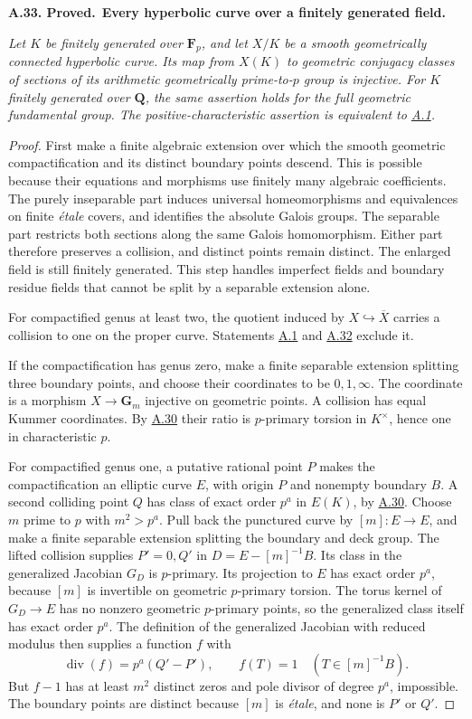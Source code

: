 \documentclass[11pt,a4paper]{article}
\newenvironment{claim}[3]{\par\medskip\noindent\hypertarget{#1}{\textbf{#1. #2.}}\ \textbf{#3.}\par\nopagebreak\smallskip\begingroup\itshape}{\endgroup\par\smallskip}
\newcommand{\statementref}[1]{\hyperlink{#1}{#1}}
\begin{document}
\begin{claim}{A.33}{Proved}{Every hyperbolic curve over a finitely generated field}
Let $K$ be finitely generated over $\mathbf F_p$, and let $X/K$ be
a smooth geometrically connected hyperbolic curve. Its map from
$X(K)$ to geometric conjugacy classes of sections of its arithmetic
geometrically prime-to-$p$ group is injective. For $K$ finitely
generated over $\mathbf Q$, the same assertion holds for the full
geometric fundamental group. The positive-characteristic assertion
is equivalent to \statementref{A.1}.
\end{claim}
\begin{proof}
First make a finite algebraic extension over which the smooth
geometric compactification and its distinct boundary points descend.
This is possible because their equations and morphisms use finitely
many algebraic coefficients. The purely inseparable part induces
universal homeomorphisms and equivalences on finite \emph{\'{e}tale}
covers, and identifies the absolute Galois groups. The separable part
restricts both sections along the same Galois homomorphism. Either
part therefore preserves a collision, and distinct points remain
distinct. The enlarged field is still finitely generated. This step
handles imperfect fields and boundary residue fields that cannot be
split by a separable extension alone.

For compactified genus at least two, the quotient induced by
$X\hookrightarrow\overline X$ carries a collision to one on the
proper curve. Statements \statementref{A.1} and
\statementref{A.32} exclude it.

If the compactification has genus zero, make a finite separable
extension splitting three boundary points, and choose their
coordinates to be $0,1,\infty$. The coordinate is a morphism
$X\to\mathbf G_m$ injective on geometric points. A collision
has equal Kummer coordinates. By \statementref{A.30} their ratio
is $p$-primary torsion in $K^\times$, hence one in characteristic $p$.

For compactified genus one, a putative rational point $P$ makes
the compactification an elliptic curve $E$, with origin $P$ and
nonempty boundary $B$. A second colliding point $Q$ has class of
exact order $p^a$ in $E(K)$, by \statementref{A.30}. Choose $m$
prime to $p$ with $m^2>p^a$. Pull back the punctured curve by
$[m]:E\to E$, and make a finite separable extension splitting the
boundary and deck group. The lifted collision supplies $P'=0,Q'$
in $D=E-[m]^{-1}B$. Its class in the generalized Jacobian $G_D$ is
$p$-primary. Its projection to $E$ has exact order $p^a$, because
$[m]$ is invertible on geometric $p$-primary torsion. The torus
kernel of $G_D\to E$ has no nonzero geometric $p$-primary points,
so the generalized class itself has exact order $p^a$.
The definition of the generalized Jacobian with reduced modulus
then supplies a function $f$ with
\[
 \operatorname{div}(f)=p^a(Q'-P'),\qquad
 f(T)=1\quad(T\in[m]^{-1}B).
\]
But $f-1$ has at least $m^2$ distinct zeros and pole divisor of
degree $p^a$, impossible. The boundary points are distinct because
$[m]$ is \emph{\'etale}, and none is $P'$ or $Q'$.


\end{proof}
\end{document}
